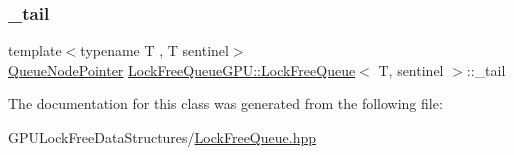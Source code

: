 \mbox{\label{class_lock_free_queue_g_p_u_1_1_lock_free_queue_a0b018993ccd81f47c7c86e1fce76aab1}} 
\subsubsection{\texorpdfstring{\+\_\+tail}{\_tail}}
{\footnotesize\ttfamily template$<$typename T , T sentinel$>$ \\
\mbox{\hyperlink{class_lock_free_queue_g_p_u_1_1_lock_free_queue_1_1_queue_node_pointer}{Queue\+Node\+Pointer}} \mbox{\hyperlink{class_lock_free_queue_g_p_u_1_1_lock_free_queue}{Lock\+Free\+Queue\+G\+P\+U\+::\+Lock\+Free\+Queue}}$<$ T, sentinel $>$\+::\+\_\+tail\hspace{0.3cm}{\ttfamily [private]}}



The documentation for this class was generated from the following file\+:\begin{DoxyCompactItemize}
\item 
G\+P\+U\+Lock\+Free\+Data\+Structures/\mbox{\hyperlink{_lock_free_queue_8hpp}{Lock\+Free\+Queue.\+hpp}}\end{DoxyCompactItemize}
